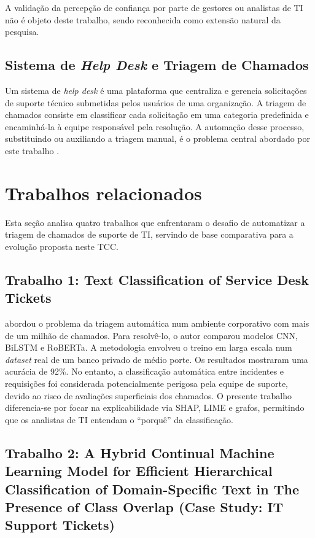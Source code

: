 \documentclass[
    12pt,                %
    openright,           %
    oneside,             %
    a4paper,             %
    english,             %
    brazil               %
]{abntex2}
\begin{document}
A validação da percepção de confiança por parte de gestores ou analistas
de TI não é objeto deste trabalho, sendo reconhecida como extensão
natural da pesquisa.


\subsection{Sistema de \textit{Help Desk} e Triagem de Chamados}
 
Um sistema de \textit{help desk} é uma plataforma que centraliza e gerencia solicitações de suporte técnico submetidas pelos usuários de uma organização. A triagem de chamados consiste em classificar cada solicitação em uma categoria predefinida e encaminhá-la à equipe responsável pela resolução. A automação desse processo, substituindo ou auxiliando a triagem manual, é o problema central abordado por este trabalho \cite{zemp2021}.

\section{Trabalhos relacionados}
\label{sec:trabalhos_relacionados}

Esta seção analisa quatro trabalhos que enfrentaram o desafio de automatizar a triagem de chamados de suporte de TI, servindo de base comparativa para a evolução proposta neste TCC.

\subsection{Trabalho 1: Text Classification of Service Desk Tickets}

 abordou o problema da triagem automática num ambiente corporativo com mais de um milhão de chamados. 
Para resolvê-lo, o autor comparou modelos CNN, BiLSTM e RoBERTa. A metodologia envolveu o treino em larga escala 
num \textit{dataset} real de um banco privado de médio porte. Os resultados mostraram uma acurácia de 92\%. 
No entanto, a classificação automática entre incidentes e requisições foi considerada potencialmente 
perigosa pela equipe de suporte, devido ao risco de avaliações superficiais dos chamados. O presente trabalho 
diferencia-se por focar na explicabilidade via SHAP, LIME e grafos, permitindo que os analistas de TI 
entendam o ``porquê'' da classificação.

\subsection{Trabalho 2: A Hybrid Continual Machine Learning Model for Efficient Hierarchical Classification of Domain-Specific Text in The Presence of Class Overlap (Case Study: IT Support Tickets)}
\end{document}
